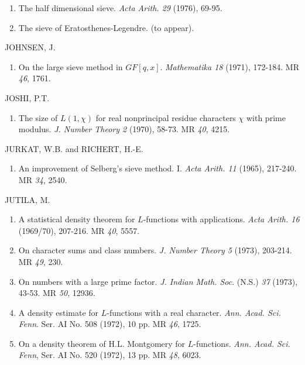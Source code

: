 \begin{thebibliography}{99}
\begin{enumerate}
\item The half dimensional sieve. \textit{Acta
  Arith. 29} (1976), 69-95. 

\item The sieve of Eratosthenes-Legendre. (to appear).
\end{enumerate}

 JOHNSEN, J.\pageoriginale
\begin{enumerate}
\item On the large sieve method in $GF[q,x]$. \textit{Mathematika 18}
  (1971), 172-184. MR {\em 46}, 1761.
\end{enumerate}

 JOSHI, P.T.
\begin{enumerate}
\item The size of $L(1,\chi)$ for real nonprincipal residue characters
  $\chi$ with prime modulus. \textit{J. Number Theory 2} (1970),
  58-73. MR {\em 40}, 4215.
\end{enumerate}

 JURKAT, W.B. and RICHERT, H.-E.
\begin{enumerate}
\item An improvement of Selberg's sieve method. I. \textit{Acta
  Arith. 11} (1965), 217-240. MR {\em 34}, 2540.
\end{enumerate}

 JUTILA, M.
\begin{enumerate}
\item A statistical density theorem for $L$-functions with
  applications. {\em Acta Arith. 16} (1969/70), 207-216. MR {\em 40},
  5557. 

\item On character sums and class numbers. \textit{J. Number Theory
  5} (1973), 203-214. MR {\em 49}, 230. 

\item On numbers with a large prime factor. \textit{J. Indian
  Math. Soc}. (N.S.) {\em 37} (1973), 43-53. MR {\em 50}, 12936. 

\item A density estimate for $L$-functions with a real
  character. \textit{Ann. Acad. Sci. Fenn}. Ser. AI
  No. 508 (1972), 10 pp. MR {\em 46}, 1725.
 
\item On a density theorem of H.L. Montgomery for
  $L$-functions. \textit{Ann. Acad. Sci. Fenn}, Ser. AI
  No. 520 (1972), 13 pp. MR {\em 48}, 6023. 


\end{enumerate}
\end{thebibliography}
